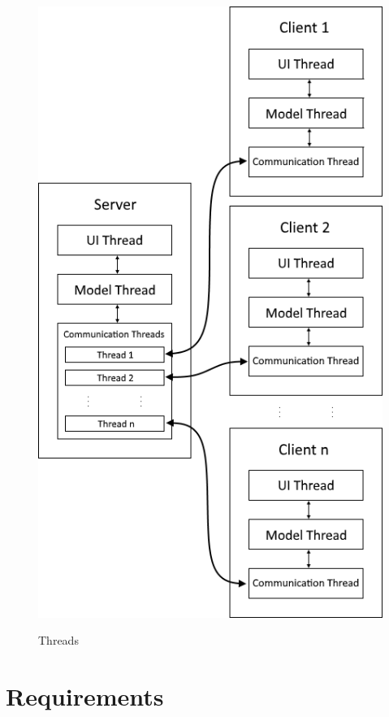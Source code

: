 \documentclass{report}
\newcommand{\lfig}[1]{\label{fig:#1}}
\begin{document}
\begin{figure} [ht!]
	\centering
    \includegraphics[width=\columnwidth]{threads.png}
    \lfig{threads}
    \vspace{-5mm} %
	\caption{Threads}
\end{figure}

\section{Requirements}
\end{document}
